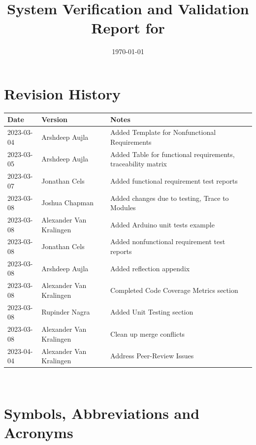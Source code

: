 \documentclass[12pt, titlepage]{article}
\begin{document}
\title{System Verification and Validation Report for \progname{}} 
\author{\authname}
\date{\today}
	
\maketitle


\section{Revision History}

\begin{tabularx}{\textwidth}{p{3cm}p{2cm}X}
\toprule {\bf Date} & {\bf Version} & {\bf Notes}\\
\midrule
2023-03-04 & Arshdeep Aujla & Added Template for Nonfunctional Requirements\\
2023-03-05 & Arshdeep Aujla & Added Table for functional requirements, traceability matrix\\
2023-03-07 & Jonathan Cels & Added functional requirement test reports\\
2023-03-08 & Joshua Chapman & Added changes due to testing, Trace to Modules\\
2023-03-08 & Alexander Van Kralingen & Added Arduino unit tests example\\
2023-03-08 & Jonathan Cels & Added nonfunctional requirement test reports\\
2023-03-08 & Arshdeep Aujla & Added reflection appendix\\
2023-03-08 & Alexander Van Kralingen & Completed Code Coverage Metrics section\\
2023-03-08 & Rupinder Nagra & Added Unit Testing section\\
2023-03-08 & Alexander Van Kralingen & Clean up merge conflicts\\
2023-04-04 & Alexander Van Kralingen & Address Peer-Review Issues\\
\bottomrule
\end{tabularx}

~\newpage

\section{Symbols, Abbreviations and Acronyms}
\end{document}

